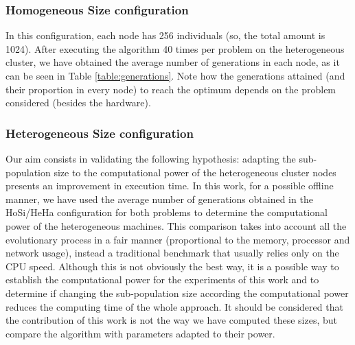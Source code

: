 \documentclass[final,1p,times]{elsarticle}
\begin{document}
\subsubsection{Homogeneous Size configuration}

In this configuration, each node has 256 individuals (so, the total amount is 1024). After executing the algorithm 40 times per problem on the heterogeneous cluster, we have obtained the average number of generations in each node, as it can be seen in Table \ref{table:generations}. Note how the generations attained (and their proportion in every node) to reach the optimum depends on the problem considered (besides the hardware).

\begin{table}
\end{table}


\subsubsection{Heterogeneous Size configuration}

Our aim consists in validating the following hypothesis: adapting the sub-population size to the computational power of the heterogeneous cluster nodes presents an improvement in execution time. In this work, for a possible offline manner, we have used the average number of generations obtained in the HoSi/HeHa configuration for both problems to determine the computational power of the heterogeneous machines. This comparison takes into account all the evolutionary process in a fair manner (proportional to the memory, processor and network usage), instead a traditional benchmark that usually relies only on the CPU speed. Although this is not obviously the best way, it is a possible way to establish the computational power for the experiments of this work and to determine if changing the sub-population size according the computational power reduces the computing time of the whole approach. It should be considered that the contribution of this work is not the way we have computed these sizes, but compare the algorithm with parameters adapted to their power.
\end{document}
